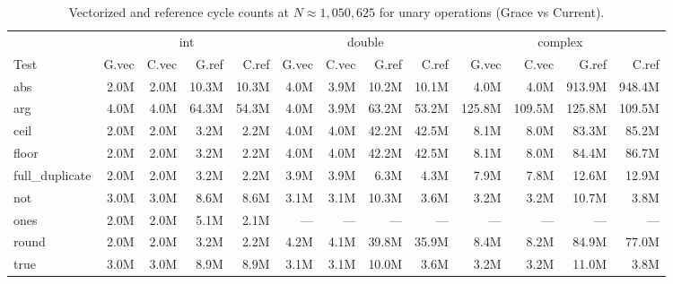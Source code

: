 \begin{table}[H]
\centering
\caption{Vectorized and reference cycle counts at $N \approx 1{,}050{,}625$ for unary operations (Grace vs Current).}
\label{tab:cycles-unary}
\tiny
\begin{tabular}{l | r r r r | r r r r | r r r r}
\toprule
 & \multicolumn{4}{c|}{int} & \multicolumn{4}{c|}{double} & \multicolumn{4}{c}{complex} \\
Test & G.vec & C.vec & G.ref & C.ref & G.vec & C.vec & G.ref & C.ref & G.vec & C.vec & G.ref & C.ref \\
\midrule
  abs & 2.0M & 2.0M & 10.3M & 10.3M & 4.0M & 3.9M & 10.2M & 10.1M & 4.0M & 4.0M & 913.9M & 948.4M \\
  arg & 4.0M & 4.0M & 64.3M & 54.3M & 4.0M & 3.9M & 63.2M & 53.2M & 125.8M & 109.5M & 125.8M & 109.5M \\
  ceil & 2.0M & 2.0M & 3.2M & 2.2M & 4.0M & 4.0M & 42.2M & 42.5M & 8.1M & 8.0M & 83.3M & 85.2M \\
  floor & 2.0M & 2.0M & 3.2M & 2.2M & 4.0M & 4.0M & 42.2M & 42.5M & 8.1M & 8.0M & 84.4M & 86.7M \\
  full\_duplicate & 2.0M & 2.0M & 3.2M & 2.2M & 3.9M & 3.9M & 6.3M & 4.3M & 7.9M & 7.8M & 12.6M & 12.9M \\
  not & 3.0M & 3.0M & 8.6M & 8.6M & 3.1M & 3.1M & 10.3M & 3.6M & 3.2M & 3.2M & 10.7M & 3.8M \\
  ones & 2.0M & 2.0M & 5.1M & 2.1M & --- & --- & --- & --- & --- & --- & --- & --- \\
  round & 2.0M & 2.0M & 3.2M & 2.2M & 4.2M & 4.1M & 39.8M & 35.9M & 8.4M & 8.2M & 84.9M & 77.0M \\
  true & 3.0M & 3.0M & 8.9M & 8.9M & 3.1M & 3.1M & 10.0M & 3.6M & 3.2M & 3.2M & 11.0M & 3.8M \\
\bottomrule
\end{tabular}
\end{table}
